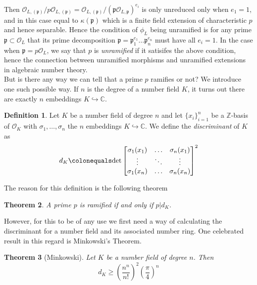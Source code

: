 \documentclass{article}
\newtheorem{theorem}{Theorem}[section]
\theoremstyle{definition}
\newtheorem{definition}[theorem]{Definition}
\theoremstyle{remark}
\theoremstyle{plain}
\newcommand{\C}{\mathbb{C}}
\newcommand{\Z}{\mathbb{Z}}
\newcommand{\mc}[1]{\mathcal{#1}}
\newcommand{\mk}[1]{\mathfrak{#1}}
\begin{document}
Then $\mc{O}_{L, (\mk{p})}/p \mc{O}_{L, (\mk{p})} = \mc{O}_{L, (\mk{p})}/(\mk{p} \mc{O}_{L, \mk{p}})^{e_i}$
is only unreduced only when $e_1 = 1$, and in this case equal to $\kappa(\mk{p})$  which is a finite field extension of characteristic $p$ and hence separable.
Hence the condition of $\phi_L$ being unramified is for any prime $\mk{p} \subset \mc{O}_L$ that its prime decomposition $\mk{p} =  \mk{p}_1^{e_1} \dots \mk{p}_n^{e_n}$ must have all $e_i = 1$.
In the case when $\mk{p} = p\mc{O}_L$, we say that $p$ is  \textit{unramified} if it satisifes the above condition, hence the connection between unramified morphisms and unramified extensions in algebraic number theory.\\

But is there any way we can tell that a prime $p$ ramifies or not?
We introduce one such possible way. 
If $n$ is the degree of a number field $K$, it turns out there are exactly $n$ embeddings $K \hookrightarrow \C$.


\begin{definition}
	Let $K$ be a number field of degree $n$ and let $\{x_i\}_{i=1}^n$ be a $\Z$-basis of $\mc{O}_K$ with $\sigma_1, \dots, \sigma_n$ the $n$ embeddings $K \hookrightarrow \C$.
	We define the \textit{discriminant} of $K$ as 
	\[d_K \colonequals \text{det}\begin{bmatrix} 
    \sigma_1(x_1) & \dots  & \sigma_n(x_1)\\
    \vdots & \ddots & \vdots\\
    \sigma_1(x_n) & \dots  & \sigma_n(x_n)
    \end{bmatrix}^2\]
\end{definition}

The reason for this definition is the following theorem

\begin{theorem}
	A prime $p$ is ramified if and only if $p|d_K$.
\end{theorem}

However, for this to be of any use we first need a way of calculating the discriminant for a number field and its associated number ring.
One celebrated result in this regard is Minkowski's Theorem.

\begin{theorem}[Minkowski]
	Let $K$ be a number field of degree $n$.
	Then 
	\[d_K \geq (\frac{n^n}{n!})^2 ( \frac{\pi}{4})^n\]
\end{theorem}
\end{document}
